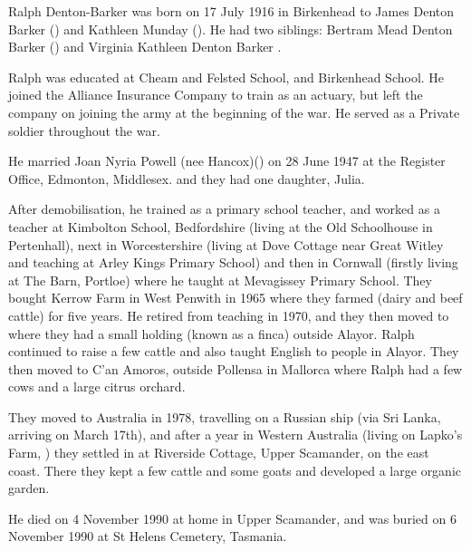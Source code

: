 
Ralph Denton-Barker was born on 17 July 1916 in Birkenhead to James Denton Barker () and
Kathleen Munday (). He had two siblings: Bertram Mead Denton Barker () and Virginia Kathleen Denton Barker \cite{BMDIndex_RalphMundayDentonBarker_birth}.

Ralph was educated at Cheam and Felsted School, and Birkenhead School. He joined the Alliance Insurance Company to train as an actuary, but left the company on joining the army at the beginning of the war. He served as a Private soldier throughout the war. 

He married Joan Nyria Powell (nee Hancox)() on 28 June 1947 at the Register Office, Edmonton, Middlesex.\cite{MarriageCertRalphDentonBarkerJoanNyriaPowell} and they had one daughter, Julia.

After demobilisation, he trained as a primary school teacher, and worked as a teacher at Kimbolton School,  Bedfordshire (living at the Old Schoolhouse in Pertenhall), next in  Worcestershire (living at Dove Cottage near Great Witley and teaching at Arley Kings Primary School) and then in Cornwall (firstly living at The Barn, Portloe) where he taught at Mevagissey Primary School.  They  bought Kerrow Farm in West Penwith in 1965 where they farmed (dairy and beef cattle) for five years. 
He retired from teaching in 1970, and they then moved to  where they had a small holding (known as a finca) outside Alayor. Ralph continued to raise a few cattle and also taught English to people in Alayor.  They then moved to C'an Amoros, outside Pollensa in Mallorca where Ralph had a few cows and a large citrus orchard.

They moved to Australia in 1978, travelling on a Russian ship (via Sri Lanka, arriving on March 17th), and after a year in Western Australia (living on Lapko's Farm, ) they settled in  at Riverside Cottage, Upper Scamander, on the east coast. There they kept a few cattle and some goats and developed a large organic garden.

He died on 4 November 1990\cite{RMDBarkerDeath, RalphDeathCert} at home in Upper Scamander, and was buried on 6 November 1990 at St Helens Cemetery, Tasmania.

